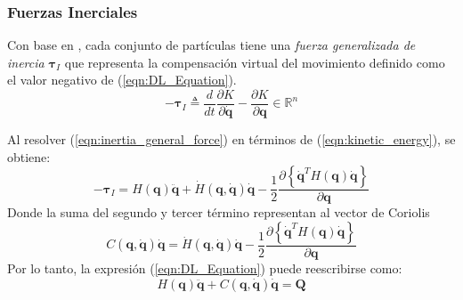     \subsubsection{Fuerzas Inerciales}   
    Con base en \cite{3DMotion}, cada conjunto de partículas tiene una \emph{fuerza generalizada de inercia} $\boldsymbol{\tau}_I$ que representa la compensación
    virtual del movimiento definido como el valor negativo de (\ref{eqn:DL_Equation}). 
    \begin{equation}
        \label{eqn:inertia_general_force}
        -\boldsymbol{\tau}_I \triangleq \frac{d}{dt} \frac{\partial K}{\partial \boldsymbol{\dot{q}}} - \frac{\partial K}{\partial \boldsymbol{q}} \in \mathbb{R}^n
    \end{equation}
    
    Al resolver (\ref{eqn:inertia_general_force}) en términos de (\ref{eqn:kinetic_energy}), se obtiene:
    \begin{equation}
        \label{eqn:inertial_terms}
        -\boldsymbol{\tau}_I = H(\boldsymbol{q}) \boldsymbol{\ddot{q}} + \dot{H}(\boldsymbol{q}, \boldsymbol{{\dot{q}}}) \boldsymbol{{\dot{q}}}
        - \frac{1}{2} \frac{\partial \left \{ \boldsymbol{\dot{q}}^T H(\boldsymbol{q}) \boldsymbol{\dot{q}} \right \} }{\partial \boldsymbol{q}}
    \end{equation}
    Donde la suma del segundo y tercer término representan al vector de Coriolis
    \begin{equation}
        \label{eqn:coriolis_term}
        C(\boldsymbol{q}, \boldsymbol{\dot{q}}) \boldsymbol{\dot{q}} = \dot{H}(\boldsymbol{q}, \boldsymbol{{\dot{q}}}) \boldsymbol{{\dot{q}}}
        - \frac{1}{2} \frac{\partial \left \{ \boldsymbol{\dot{q}}^T H(\boldsymbol{q}) \boldsymbol{\dot{q}} \right \} }{\partial \boldsymbol{q}}
    \end{equation} 
    Por lo tanto, la expresión (\ref{eqn:DL_Equation}) puede reescribirse como:
    \begin{equation}
        \label{eqn:DL_vectors}
        H(\boldsymbol{q}) \boldsymbol{\ddot{q}} + C(\boldsymbol{q}, \boldsymbol{\dot{q}}) \boldsymbol{\dot{q}} = \boldsymbol{Q}
    \end{equation}
    
